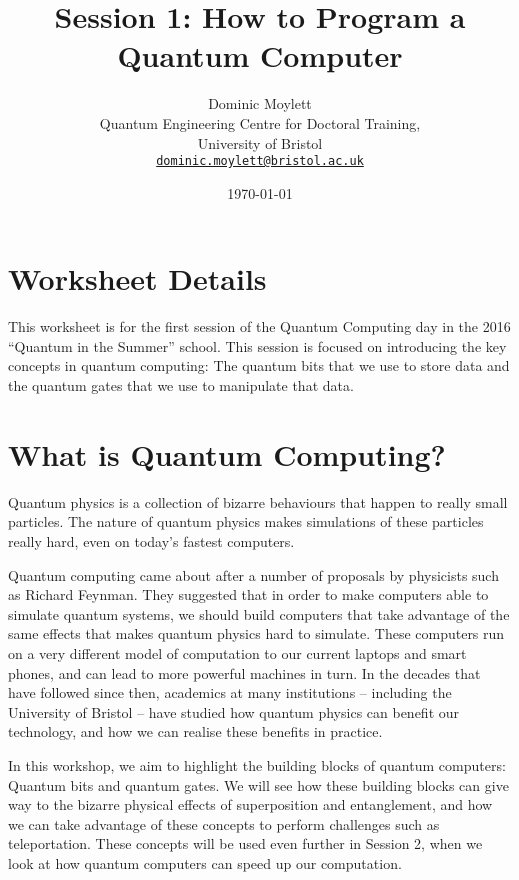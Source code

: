 \documentclass[twocolumn]{article}
\begin{document}
\lstset{style=Style1}

\title{Session 1: How to Program a Quantum Computer}
\author{Dominic Moylett\\
        	Quantum Engineering Centre for Doctoral Training,\\
		University of Bristol\\
		\texttt{\href{mailto:dominic.moylett@bristol.ac.uk}{dominic.moylett@bristol.ac.uk}}
		}
\date{\today}
\maketitle

\section*{Worksheet Details}

This worksheet is for the first session of the Quantum Computing day in the 2016 ``Quantum in the Summer'' school. This session is focused on introducing the key concepts in quantum computing: The quantum bits that we use to store data and the quantum gates that we use to manipulate that data.

\section{What is Quantum Computing?}

Quantum physics is a collection of bizarre behaviours that happen to really small particles. The nature of quantum physics makes simulations of these particles really hard, even on today's fastest computers.

Quantum computing came about after a number of proposals by physicists such as Richard Feynman. They suggested that in order to make computers able to simulate quantum systems, we should build computers that take advantage of the same effects that makes quantum physics hard to simulate. These computers run on a very different model of computation to our current laptops and smart phones, and can lead to more powerful machines in turn. In the decades that have followed since then, academics at many institutions -- including the University of Bristol -- have studied how quantum physics can benefit our technology, and how we can realise these benefits in practice.

In this workshop, we aim to highlight the building blocks of quantum computers: Quantum bits and quantum gates. We will see how these building blocks can give way to the bizarre physical effects of superposition and entanglement, and how we can take advantage of these concepts to perform challenges such as teleportation. These concepts will be used even further in Session 2, when we look at how quantum computers can speed up our computation.
\end{document}
